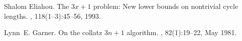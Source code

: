 \documentclass[11pt,twoside,a4paper]{report}
\begin{document}
%
%
\cleardoublepage
\iffalse
  
\else
  \begin{thebibliography}{10}

  Shalom Eliahou.
  \newblock The $3x+1$ problem: New lower bounds on nontrivial cycle lengths.
  , 118(1--3):45--56, 1993.

  Lynn~E. Garner.
  \newblock On the collatz $3n+1$ algorithm.
  , 82(1):19--22,
    May 1981.
  \end{thebibliography}
\fi
\cleardoublepage
\end{document}
